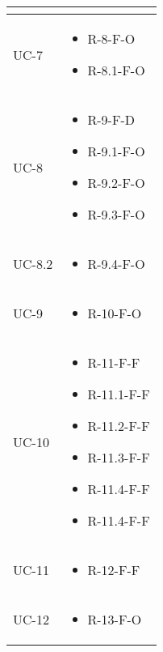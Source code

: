 \begin{center}
\begin{longtable}{| C{6cm} |C{6cm}|}
\begin{itemize}
        \end{itemize} \\\hline
        UC-7 &
        \begin{itemize}
            \item R-8-F-O
            \item R-8.1-F-O
        \end{itemize} \\\hline
        UC-8 &
        \begin{itemize}
            \item R-9-F-D
            \item R-9.1-F-O
            \item R-9.2-F-O
            \item R-9.3-F-O
        \end{itemize} \\\hline
        UC-8.2 &
        \begin{itemize}
            \item R-9.4-F-O
        \end{itemize} \\\hline
        UC-9 & \begin{itemize}
                   \item R-10-F-O
        \end{itemize} \\\hline
        UC-10 &
        \begin{itemize}
            \item R-11-F-F
            \item R-11.1-F-F
            \item R-11.2-F-F
            \item R-11.3-F-F
            \item R-11.4-F-F
            \item R-11.4-F-F
        \end{itemize}
        \\\hline

        UC-11 &
        \begin{itemize}
            \item R-12-F-F
        \end{itemize}
        \\\hline

        UC-12 &
        \begin{itemize}
            \item R-13-F-O
        \end{itemize}
        \\\hline


\end{longtable}
\end{center}
